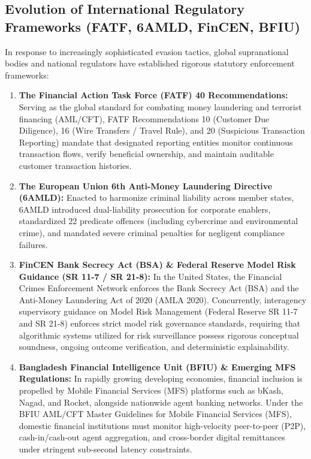 \subsection{Evolution of International Regulatory Frameworks (FATF, 6AMLD, FinCEN, BFIU)}
In response to increasingly sophisticated evasion tactics, global supranational bodies and national regulators have established rigorous statutory enforcement frameworks:
\begin{enumerate}
    \item \textbf{The Financial Action Task Force (FATF) 40 Recommendations:} Serving as the global standard for combating money laundering and terrorist financing (AML/CFT), FATF Recommendations 10 (Customer Due Diligence), 16 (Wire Transfers / Travel Rule), and 20 (Suspicious Transaction Reporting) mandate that designated reporting entities monitor continuous transaction flows, verify beneficial ownership, and maintain auditable customer transaction histories.
    \item \textbf{The European Union 6th Anti-Money Laundering Directive (6AMLD):} Enacted to harmonize criminal liability across member states, 6AMLD introduced dual-liability prosecution for corporate enablers, standardized 22 predicate offences (including cybercrime and environmental crime), and mandated severe criminal penalties for negligent compliance failures.
    \item \textbf{FinCEN Bank Secrecy Act (BSA) \& Federal Reserve Model Risk Guidance (SR 11-7 / SR 21-8):} In the United States, the Financial Crimes Enforcement Network enforces the Bank Secrecy Act (BSA) and the Anti-Money Laundering Act of 2020 (AMLA 2020). Concurrently, interagency supervisory guidance on Model Risk Management (Federal Reserve SR 11-7 and SR 21-8) enforces strict model risk governance standards, requiring that algorithmic systems utilized for risk surveillance possess rigorous conceptual soundness, ongoing outcome verification, and deterministic explainability.
    \item \textbf{Bangladesh Financial Intelligence Unit (BFIU) \& Emerging MFS Regulations:} In rapidly growing developing economies, financial inclusion is propelled by Mobile Financial Services (MFS) platforms such as bKash, Nagad, and Rocket, alongside nationwide agent banking networks. Under the BFIU AML/CFT Master Guidelines for Mobile Financial Services (MFS), domestic financial institutions must monitor high-velocity peer-to-peer (P2P), cash-in/cash-out agent aggregation, and cross-border digital remittances under stringent sub-second latency constraints.
\end{enumerate}

